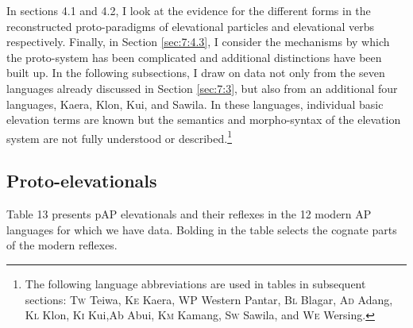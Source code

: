 In sections 4.1 and 4.2, I look at the evidence for the different forms in the reconstructed proto-paradigms of elevational particles and elevational verbs respectively. Finally, in Section \ref{sec:7:4.3}, I consider the mechanisms by which the proto-system has been complicated and additional distinctions have been built up. In the following subsections, I draw on data not only from the seven languages already discussed in Section \ref{sec:7:3}, but also from an additional four languages, Kaera, Klon, Kui, and Sawila. In these languages, individual basic elevation terms are known but the semantics and morpho-syntax of the elevation system are not fully understood or described.\footnote{{}  The following language abbreviations are used in tables in subsequent sections: \textsc{Tw} Teiwa, \textsc{Ke} Kaera, \textsc{WP} Western Pantar, \textsc{Bl} Blagar, \textsc{Ad} Adang, \textsc{Kl} Klon, \textsc{Ki} Kui,\textsc Ab  Abui, \textsc{Km} Kamang, \textsc{Sw} Sawila, and \textsc{We} Wersing.} 

\subsection{Proto-elevationals}\label{sec:7:4.1}
Table 13 presents pAP elevationals and their reflexes in the 12 modern AP languages for which we have data. Bolding in the table selects the cognate parts of the modern reflexes.

 


